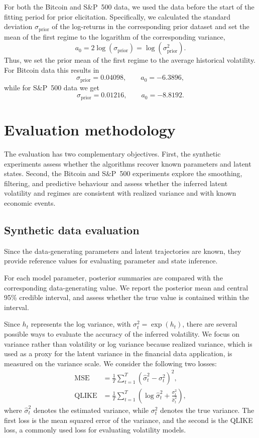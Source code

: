 For both the Bitcoin and S\&P~500 data, we used the data before the
start of the fitting period for prior elicitation.  Specifically, we
calculated the standard deviation $\sigma_{\mathrm{prior}}$ of the log-returns
in the corresponding prior dataset and set the mean of the first regime to
the logarithm of the corresponding variance,
\[
a_0 = 2\log\left(\sigma_{\mathrm{prior}}\right)
    = \log\left(\sigma_{\mathrm{prior}}^2\right).
\]
Thus, we set the prior mean of the first regime to the average historical volatility. For Bitcoin data this results in
\[
\sigma_{\mathrm{prior}} = 0.04098, \qquad a_0 = -6.3896,
\]
while for S\&P~500 data we get
\[
\sigma_{\mathrm{prior}} = 0.01216, \qquad a_0 = -8.8192.
\]

\section{Evaluation methodology}
\label{sec:evaluation_methodology}

The evaluation has two complementary objectives. First, the synthetic experiments
assess whether the algorithms recover known parameters and latent states. Second,
the Bitcoin and S\&P~500 experiments explore the smoothing, filtering, and predictive behaviour and assess whether the inferred latent volatility and regimes are consistent with realized variance and with known economic events.  

\subsection{Synthetic data evaluation}

Since the data-generating parameters and latent trajectories are known, they provide reference values for evaluating parameter and state inference.

For each model parameter, posterior summaries are compared with the corresponding data-generating value. We report the posterior mean and central 95\% credible interval, and assess whether the true value is contained within the interval.

Since $h_t$ represents the log variance, with $\sigma_t^2 = \exp(h_t)$, there are several possible ways to evaluate the accuracy of the inferred volatility. We focus on variance rather than volatility or log variance because realized variance, which is used as a proxy for the latent variance in the financial data application, is measured on the variance scale.
We consider the following two losses:
\begin{align*}
    \operatorname{MSE} &=
    \frac{1}{T}\sum_{t=1}^T
    \left(\hat{\sigma}_t^2-\sigma_t^2\right)^2, \\
    \operatorname{QLIKE} &=
    \frac{1}{T}\sum_{t=1}^T
    \left(
    \log\hat{\sigma}_t^2+
    \frac{\sigma_t^2}{\hat{\sigma}_t^2}
    \right),
\end{align*}
where $\hat{\sigma}_t^2$ denotes the estimated variance, while $\sigma_t^2$ denotes the true variance. The first loss is the mean squared error of the variance, and the second is the QLIKE loss, a commonly used loss for evaluating volatility models.

